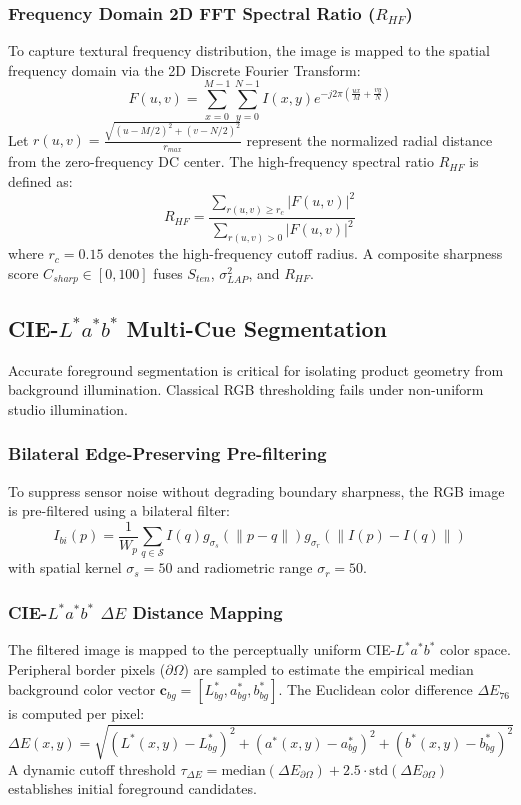 \documentclass[conference]{IEEEtran}
\begin{document}
\subsubsection{Frequency Domain 2D FFT Spectral Ratio ($R_{HF}$)}
To capture textural frequency distribution, the image is mapped to the spatial frequency domain via the 2D Discrete Fourier Transform:
\begin{equation}
F(u,v) = \sum_{x=0}^{M-1} \sum_{y=0}^{N-1} I(x,y) e^{-j 2\pi \left( \frac{ux}{M} + \frac{vy}{N} \right)}
\end{equation}
Let $r(u,v) = \frac{\sqrt{(u - M/2)^2 + (v - N/2)^2}}{r_{max}}$ represent the normalized radial distance from the zero-frequency DC center. The high-frequency spectral ratio $R_{HF}$ is defined as:
\begin{equation}
R_{HF} = \frac{\sum_{r(u,v) \ge r_c} |F(u,v)|^2}{\sum_{r(u,v) > 0} |F(u,v)|^2}
\end{equation}
where $r_c = 0.15$ denotes the high-frequency cutoff radius. A composite sharpness score $C_{sharp} \in [0, 100]$ fuses $S_{ten}$, $\sigma_{LAP}^2$, and $R_{HF}$.

\subsection{CIE-$L^*a^*b^*$ Multi-Cue Segmentation}
Accurate foreground segmentation is critical for isolating product geometry from background illumination. Classical RGB thresholding fails under non-uniform studio illumination.

\subsubsection{Bilateral Edge-Preserving Pre-filtering}
To suppress sensor noise without degrading boundary sharpness, the RGB image is pre-filtered using a bilateral filter:
\begin{equation}
I_{bi}(p) = \frac{1}{W_p} \sum_{q \in \mathcal{S}} I(q) g_{\sigma_s}(\|p - q\|) g_{\sigma_r}(\|I(p) - I(q)\|)
\end{equation}
with spatial kernel $\sigma_s = 50$ and radiometric range $\sigma_r = 50$.

\subsubsection{CIE-$L^*a^*b^*$ $\Delta E$ Distance Mapping}
The filtered image is mapped to the perceptually uniform CIE-$L^*a^*b^*$ color space. Peripheral border pixels ($\partial \Omega$) are sampled to estimate the empirical median background color vector $\mathbf{c}_{bg} = [L^*_{bg}, a^*_{bg}, b^*_{bg}]$. The Euclidean color difference $\Delta E_{76}$ is computed per pixel:
\begin{equation}
\Delta E(x,y) = \sqrt{(L^*(x,y) - L^*_{bg})^2 + (a^*(x,y) - a^*_{bg})^2 + (b^*(x,y) - b^*_{bg})^2}
\end{equation}
A dynamic cutoff threshold $\tau_{\Delta E} = \text{median}(\Delta E_{\partial \Omega}) + 2.5 \cdot \text{std}(\Delta E_{\partial \Omega})$ establishes initial foreground candidates.
\end{document}
